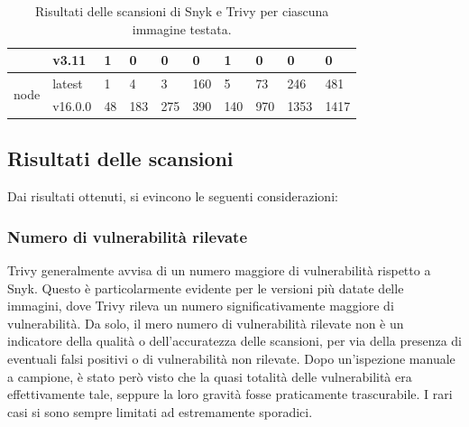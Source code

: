 \begin{table}[H]
\begin{tabularx}{\textwidth}{|l|l|X|X|X|X|X|X|X|X|}
                                 & v3.11          & 1                                  & 0                                   & 0            & 0            & 1              & 0             & 0            & 0            \\ \hline
      \multirow{2}{*}{node}      & latest         & 1                                  & 4                                   & 3            & 160          & 5              & 73            & 246          & 481          \\ \cline{2-10}
                                 & v16.0.0        & 48                                 & 183                                 & 275          & 390          & 140            & 970           & 1353         & 1417         \\ \hline
   \end{tabularx}
   \caption{Risultati delle scansioni di Snyk e Trivy per ciascuna immagine testata.}
   \label{tab:scan_results}
\end{table}
\subsection{Risultati delle scansioni}
Dai risultati ottenuti, si evincono le seguenti considerazioni:
\subsubsection{Numero di vulnerabilità rilevate}
Trivy generalmente avvisa di un numero maggiore di vulnerabilità rispetto a Snyk. Questo è particolarmente evidente per le versioni più datate delle immagini, dove Trivy rileva un numero significativamente maggiore di vulnerabilità. Da solo, il mero numero di vulnerabilità rilevate non è un indicatore della qualità o dell'accuratezza delle scansioni, per via della presenza di eventuali falsi positivi o di vulnerabilità non rilevate. Dopo un'ispezione manuale a campione, è stato però visto che la quasi totalità delle vulnerabilità era effettivamente tale, seppure la loro gravità fosse praticamente trascurabile. I rari casi si sono sempre limitati ad estremamente sporadici.


